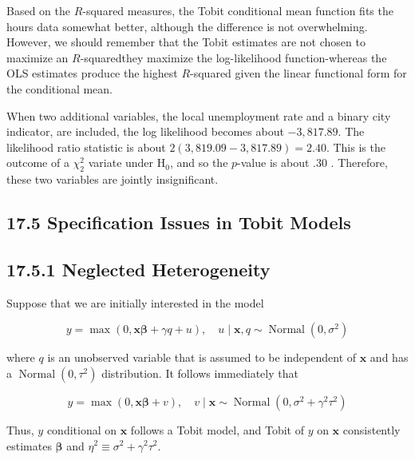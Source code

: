 \documentclass[10pt]{article}
\begin{document}
Based on the $R$-squared measures, the Tobit conditional mean function fits the hours data somewhat better, although the difference is not overwhelming. However, we should remember that the Tobit estimates are not chosen to maximize an $R$-squaredthey maximize the log-likelihood function-whereas the OLS estimates produce the highest $R$-squared given the linear functional form for the conditional mean.

When two additional variables, the local unemployment rate and a binary city indicator, are included, the log likelihood becomes about $-3,817.89$. The likelihood ratio statistic is about $2(3,819.09-3,817.89)=2.40$. This is the outcome of a $\chi_{2}^{2}$ variate under $\mathrm{H}_{0}$, and so the $p$-value is about .30 . Therefore, these two variables are jointly insignificant.

\subsection*{17.5 Specification Issues in Tobit Models}
\subsection*{17.5.1 Neglected Heterogeneity}
Suppose that we are initially interested in the model


\begin{equation*}
y=\max (0, \mathbf{x} \boldsymbol{\beta}+\gamma q+u), \quad u \mid \mathbf{x}, q \sim \operatorname{Normal}\left(0, \sigma^{2}\right) \tag{17.24}
\end{equation*}


where $q$ is an unobserved variable that is assumed to be independent of $\mathbf{x}$ and has a $\operatorname{Normal}\left(0, \tau^{2}\right)$ distribution. It follows immediately that


\begin{equation*}
y=\max (0, \mathbf{x} \boldsymbol{\beta}+v), \quad v \mid \mathbf{x} \sim \operatorname{Normal}\left(0, \sigma^{2}+\gamma^{2} \tau^{2}\right) \tag{17.25}
\end{equation*}


Thus, $y$ conditional on $\mathbf{x}$ follows a Tobit model, and Tobit of $y$ on $\mathbf{x}$ consistently estimates $\boldsymbol{\beta}$ and $\eta^{2} \equiv \sigma^{2}+\gamma^{2} \tau^{2}$.
\end{document}
